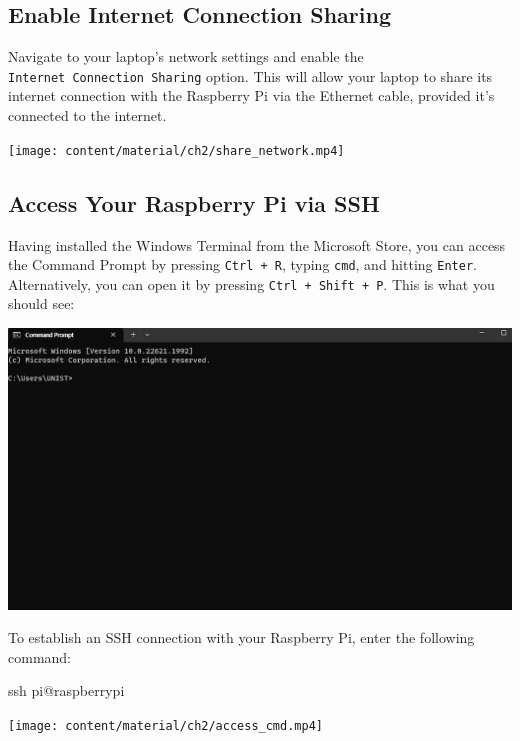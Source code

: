 \documentclass[
  letterpaper,
]{scrbook}
\newenvironment{Shaded}{\begin{snugshade}}{\end{snugshade}}
\newcommand{\FunctionTok}[1]{\textcolor[rgb]{0.28,0.35,0.67}{#1}}
\newcommand{\NormalTok}[1]{\textcolor[rgb]{0.00,0.23,0.31}{#1}}
\begin{document}
\subsection{Enable Internet Connection
Sharing}\label{enable-internet-connection-sharing}

Navigate to your laptop's network settings and enable the
\texttt{Internet\ Connection\ Sharing} option. This will allow your
laptop to share its internet connection with the Raspberry Pi via the
Ethernet cable, provided it's connected to the internet.

\texttt{[image: content/material/ch2/share\_network.mp4]}

\subsection{Access Your Raspberry Pi via
SSH}\label{access-your-raspberry-pi-via-ssh}

Having installed the Windows Terminal from the Microsoft Store, you can
access the Command Prompt by pressing \texttt{Ctrl\ +\ R}, typing
\texttt{cmd}, and hitting \texttt{Enter}. Alternatively, you can open it
by pressing \texttt{Ctrl\ +\ Shift\ +\ P}. This is what you should see:

\includegraphics{content/material/ch2/cmd_screen.png}

To establish an SSH connection with your Raspberry Pi, enter the
following command:

\begin{Shaded}
\begin{Highlighting}[]
\FunctionTok{ssh}\NormalTok{ pi@raspberrypi}
\end{Highlighting}
\end{Shaded}

\texttt{[image: content/material/ch2/access\_cmd.mp4]}
\end{document}
